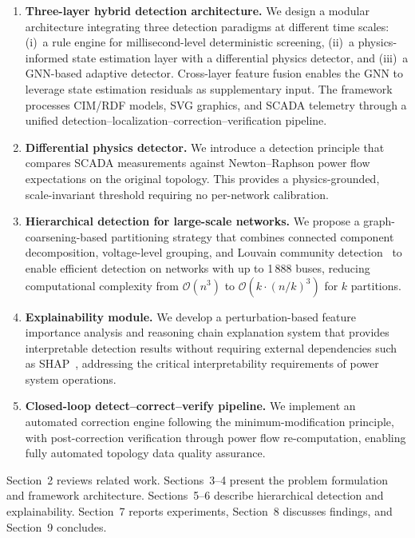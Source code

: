 \documentclass[research]{fcs}
\begin{document}
\begin{enumerate}
\item \textbf{Three-layer hybrid detection architecture.} We design a modular architecture integrating three detection paradigms at different time scales: (i)~a rule engine for millisecond-level deterministic screening, (ii)~a physics-informed state estimation layer with a differential physics detector, and (iii)~a GNN-based adaptive detector. Cross-layer feature fusion enables the GNN to leverage state estimation residuals as supplementary input. The framework processes CIM/RDF models, SVG graphics, and SCADA telemetry through a unified detection--localization--correction--verification pipeline.



\item \textbf{Differential physics detector.} We introduce a detection principle that compares SCADA measurements against Newton--Raphson power flow expectations on the original topology. This provides a physics-grounded, scale-invariant threshold requiring no per-network calibration.



\item \textbf{Hierarchical detection for large-scale networks.} We propose a graph-coarsening-based partitioning strategy that combines connected component decomposition, voltage-level grouping, and Louvain community detection~\cite{louvain2008} to enable efficient detection on networks with up to 1\,888 buses, reducing computational complexity from $\mathcal{O}(n^3)$ to $\mathcal{O}(k \cdot (n/k)^3)$ for $k$ partitions.

\item \textbf{Explainability module.} We develop a perturbation-based feature importance analysis and reasoning chain explanation system that provides interpretable detection results without requiring external dependencies such as SHAP~\cite{shap_lundberg2017}, addressing the critical interpretability requirements of power system operations.

\item \textbf{Closed-loop detect--correct--verify pipeline.} We implement an automated correction engine following the minimum-modification principle, with post-correction verification through power flow re-computation, enabling fully automated topology data quality assurance.
\end{enumerate}

Section~2 reviews related work. Sections~3--4 present the problem formulation and framework architecture. Sections~5--6 describe hierarchical detection and explainability. Section~7 reports experiments, Section~8 discusses findings, and Section~9 concludes.
\end{document}
